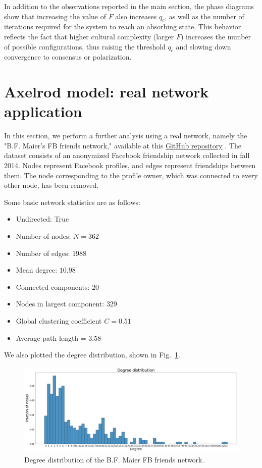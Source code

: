 In addition to the observations reported in the main section, the phase diagrams show that increasing the value of $F$ also increases $q_c$, as well as the number of iterations required for the system to reach an absorbing state.
This behavior reflects the fact that higher cultural complexity (larger $F$) increases the number of possible configurations, thus raising the threshold $q_c$ and slowing down convergence to consensus or polarization.

\section{Axelrod model: real network application}
In this section, we perform a further analysis using a real network, namely the "B.F. Maier's FB friends network," available at this \href{https://github.com/benmaier/BFMaierFBnetwork/blob/master}{GitHub repository} \cite{Maier2017}. The dataset consists of an anonymized Facebook friendship network collected in fall 2014. Nodes represent Facebook profiles, and edges represent friendships between them. The node corresponding to the profile owner, which was connected to every other node, has been removed.

Some basic network statistics are as follows:
\begin{itemize}
    \item Undirected: True
    \item Number of nodes: $N = 362$
    \item Number of edges: $1988$
    \item Mean degree: $10.98$
    \item Connected components: $20$
    \item Nodes in largest component: $329$
    \item Global clustering coefficient $C = 0.51$
    \item Average path length = $3.58$
\end{itemize}

We also plotted the degree distribution, shown in Fig.~\ref{fig:Maier_degree_distribution}.

\begin{figure}[hbtp]
    \centering
    \includegraphics[width=0.8\linewidth]{figures/task30_plots/Maier_degrees.pdf}
    \caption{Degree distribution of the B.F. Maier FB friends network.}
    \label{fig:Maier_degree_distribution}
\end{figure}

